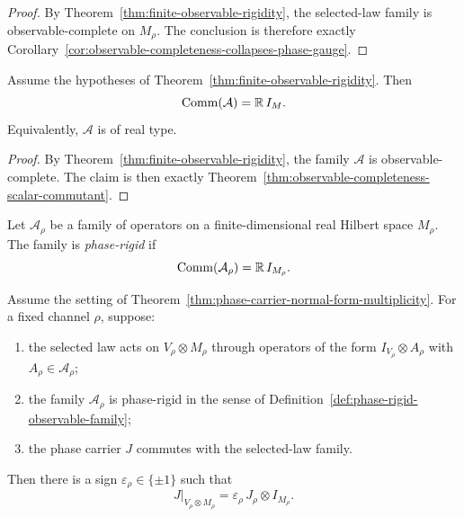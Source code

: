 \begin{proof}
By Theorem~\ref{thm:finite-observable-rigidity}, the selected-law family is
observable-complete on $M_{\rho}$. The conclusion is therefore exactly
Corollary~\ref{cor:observable-completeness-collapses-phase-gauge}.
\end{proof}

\begin{corollary}
\label{cor:finite-observable-rigidity-real-type}
Assume the hypotheses of Theorem~\ref{thm:finite-observable-rigidity}. Then
\[
\mathrm{Comm}(\mathcal A)=\mathbb{R}\,I_M.
\]
Equivalently, $\mathcal A$ is of real type.
\end{corollary}

\begin{proof}
By Theorem~\ref{thm:finite-observable-rigidity}, the family $\mathcal A$ is
observable-complete. The claim is then exactly
Theorem~\ref{thm:observable-completeness-scalar-commutant}.
\end{proof}

\begin{definition}
\label{def:phase-rigid-observable-family}
Let $\mathcal A_{\rho}$ be a family of operators on a finite-dimensional real
Hilbert space $M_{\rho}$. The family is \emph{phase-rigid} if
\[
\mathrm{Comm}(\mathcal A_{\rho})=\mathbb{R}\,I_{M_{\rho}}.
\]
\end{definition}

\begin{corollary}
\label{cor:phase-rigidity-collapses-phase-gauge}
Assume the setting of
Theorem~\ref{thm:phase-carrier-normal-form-multiplicity}. For a fixed channel
$\rho$, suppose:
\begin{enumerate}[label=(\roman*), leftmargin=2em, itemsep=0.2em]
\item the selected law acts on $V_{\rho}\otimes M_{\rho}$ through operators of
      the form $I_{V_{\rho}}\otimes A_{\rho}$ with
      $A_{\rho}\in\mathcal A_{\rho}$;
\item the family $\mathcal A_{\rho}$ is phase-rigid in the sense of
      Definition~\ref{def:phase-rigid-observable-family};
\item the phase carrier $J$ commutes with the selected-law family.
\end{enumerate}
Then there is a sign $\varepsilon_{\rho}\in\{\pm1\}$ such that
\[
J|_{V_{\rho}\otimes M_{\rho}}
=
\varepsilon_{\rho}\,J_{\rho}\otimes I_{M_{\rho}}.
\]
\end{corollary}


